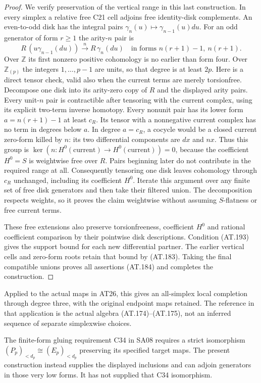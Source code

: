\begin{proof}
We verify preservation of the vertical range
in this last construction.
In every simplex a relative free C21 cell
adjoins free identity-disk complements.
An even-to-odd disk has the integral pairs
$\gamma_n(u)\mapsto\gamma_{n-1}(u)du$.
For an odd generator of form $r\geq1$ the
arity-$n$ pair is
\[
 R\,(u\gamma_{n-1}(du))
       \xrightarrow{\,n\,}R\,\gamma_n(du)
 \quad\text{in forms }n(r+1)-1,\ n(r+1).
 \tag{AT.195}
\]
Over $\mathbb Z$ its first nonzero positive
cohomology is no earlier than form four.
Over $\mathbb Z_{(p)}$ the integers $1,\ldots,p-1$
are units, so that degree is at least $2p$.
Here is a direct tensor check, valid also
when the current terms are merely torsionfree.
Decompose one disk into its arity-zero copy
of $R$ and the displayed arity pairs.
Every unit-$n$ pair is contractible after
tensoring with the current complex, using
its explicit two-term inverse homotopy.
Every nonunit pair has its lower form
$a=n(r+1)-1$ at least $c_R$.
Its tensor with a nonnegative current
complex has no term in degrees below $a$.
In degree $a=c_R$, a cocycle would be a
closed current zero-form killed by $n$:
its two differential components are
$dx$ and $nx$.
Thus this group is
$\ker(n:H^0(\text{current})\to H^0(\text{current}))=0$,
because the coefficient $H^0=S$ is weightwise
free over $R$. Pairs beginning later do not
contribute in the required range at all.
Consequently tensoring one disk leaves
cohomology through $c_R$ unchanged, including
its coefficient $H^0$.
Iterate this argument over any finite
set of free disk generators and then take
their filtered union.
The decomposition respects weights, so
it proves the claim weightwise without
assuming $S$-flatness or free current terms.

These free extensions also preserve
torsionfreeness, coefficient $H^0$ and
rational coefficient comparison by their
pointwise disk descriptions.
Condition (AT.193) gives the support bound
for each new differential partner.
The earlier vertical cells and zero-form
roots retain that bound by (AT.183).
Taking the final compatible unions proves
all assertions (AT.184) and completes the
construction.
\end{proof}

Applied to the actual maps in AT26, this gives
an all-simplex local completion through degree
three, with the original endpoint maps retained.
The reference in that application is the actual
algebra (AT.174)--(AT.175), not an inferred
sequence of separate simplexwise choices.

The finite-form gluing requirement C34 in
SA08 requires a strict isomorphism
$(P_p)_{<d_p}\cong(E_p)_{<d_p}$ preserving its
specified target maps. The present construction
instead supplies the displayed inclusions and
can adjoin generators in those very low forms.
It has not supplied that C34 isomorphism.
